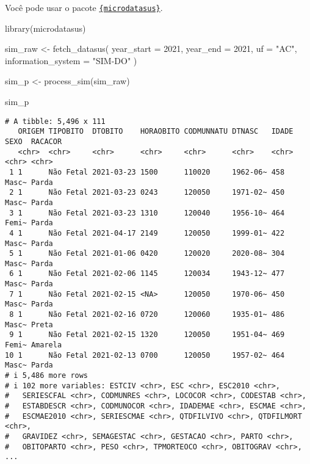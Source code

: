 \documentclass[
  letterpaper,
  DIV=11,
  numbers=noendperiod]{scrreprt}
\newenvironment{Shaded}{\begin{snugshade}}{\end{snugshade}}
\newcommand{\AttributeTok}[1]{\textcolor[rgb]{0.40,0.45,0.13}{#1}}
\newcommand{\DecValTok}[1]{\textcolor[rgb]{0.68,0.00,0.00}{#1}}
\newcommand{\FunctionTok}[1]{\textcolor[rgb]{0.28,0.35,0.67}{#1}}
\newcommand{\NormalTok}[1]{\textcolor[rgb]{0.00,0.23,0.31}{#1}}
\newcommand{\OtherTok}[1]{\textcolor[rgb]{0.00,0.23,0.31}{#1}}
\newcommand{\StringTok}[1]{\textcolor[rgb]{0.13,0.47,0.30}{#1}}
\begin{document}
Você pode usar o pacote
\href{https://rfsaldanha.github.io/microdatasus/index.html}{\texttt{\{microdatasus\}}}.

\begin{Shaded}
\begin{Highlighting}[]
\FunctionTok{library}\NormalTok{(microdatasus)}

\NormalTok{sim\_raw }\OtherTok{\textless{}{-}} \FunctionTok{fetch\_datasus}\NormalTok{(}
  \AttributeTok{year\_start =} \DecValTok{2021}\NormalTok{,}
  \AttributeTok{year\_end =} \DecValTok{2021}\NormalTok{,}
  \AttributeTok{uf =} \StringTok{"AC"}\NormalTok{,}
  \AttributeTok{information\_system =} \StringTok{"SIM{-}DO"}
\NormalTok{)}

\NormalTok{sim\_p }\OtherTok{\textless{}{-}} \FunctionTok{process\_sim}\NormalTok{(sim\_raw)}

\NormalTok{sim\_p}
\end{Highlighting}
\end{Shaded}

\begin{verbatim}
# A tibble: 5,496 x 111
   ORIGEM TIPOBITO  DTOBITO    HORAOBITO CODMUNNATU DTNASC   IDADE SEXO  RACACOR
   <chr>  <chr>     <chr>      <chr>     <chr>      <chr>    <chr> <chr> <chr>  
 1 1      Não Fetal 2021-03-23 1500      110020     1962-06~ 458   Masc~ Parda  
 2 1      Não Fetal 2021-03-23 0243      120050     1971-02~ 450   Masc~ Parda  
 3 1      Não Fetal 2021-03-23 1310      120040     1956-10~ 464   Femi~ Parda  
 4 1      Não Fetal 2021-04-17 2149      120050     1999-01~ 422   Masc~ Parda  
 5 1      Não Fetal 2021-01-06 0420      120020     2020-08~ 304   Masc~ Parda  
 6 1      Não Fetal 2021-02-06 1145      120034     1943-12~ 477   Masc~ Parda  
 7 1      Não Fetal 2021-02-15 <NA>      120050     1970-06~ 450   Masc~ Parda  
 8 1      Não Fetal 2021-02-16 0720      120060     1935-01~ 486   Masc~ Preta  
 9 1      Não Fetal 2021-02-15 1320      120050     1951-04~ 469   Femi~ Amarela
10 1      Não Fetal 2021-02-13 0700      120050     1957-02~ 464   Masc~ Parda  
# i 5,486 more rows
# i 102 more variables: ESTCIV <chr>, ESC <chr>, ESC2010 <chr>,
#   SERIESCFAL <chr>, CODMUNRES <chr>, LOCOCOR <chr>, CODESTAB <chr>,
#   ESTABDESCR <chr>, CODMUNOCOR <chr>, IDADEMAE <chr>, ESCMAE <chr>,
#   ESCMAE2010 <chr>, SERIESCMAE <chr>, QTDFILVIVO <chr>, QTDFILMORT <chr>,
#   GRAVIDEZ <chr>, SEMAGESTAC <chr>, GESTACAO <chr>, PARTO <chr>,
#   OBITOPARTO <chr>, PESO <chr>, TPMORTEOCO <chr>, OBITOGRAV <chr>, ...
\end{verbatim}
\end{document}
